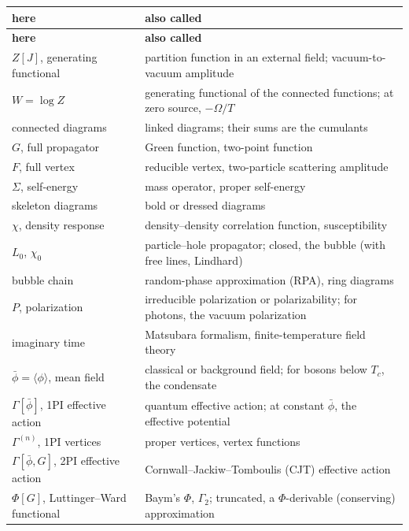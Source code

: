 \documentclass[11pt,a4paper]{article}
\begin{document}
\smallskip
{\footnotesize\renewcommand{\arraystretch}{1.16}\setlength{\LTpre}{0pt}\setlength{\LTpost}{0pt}%
\begin{xltabular}{\linewidth}{@{}>{\raggedright\arraybackslash}p{4.9cm}@{\hspace{0.8em}}>{\raggedright\arraybackslash}X@{}}
\toprule
\textsf{\textbf{here}} & \textsf{\textbf{also called}}\\
\midrule
\endfirsthead
\toprule
\textsf{\textbf{here}} & \textsf{\textbf{also called}}\\
\midrule
\endhead
\bottomrule
\endlastfoot
$Z[J]$, generating functional & partition function in an external field; vacuum-to-vacuum amplitude\\
$W=\log Z$ & generating functional of the connected functions; at zero source, $-\Omega/T$\\
connected diagrams & linked diagrams; their sums are the cumulants\\
$G$, full propagator & Green function, two-point function\\
$F$, full vertex & reducible vertex, two-particle scattering amplitude\\
$\Sigma$, self-energy & mass operator, proper self-energy\\
skeleton diagrams & bold or dressed diagrams\\
$\chi$, density response & density--density correlation function, susceptibility\\
$L_0$, $\chi_0$ & particle--hole propagator; closed, the bubble (with free lines, Lindhard)\\
bubble chain & random-phase approximation (RPA), ring diagrams\\
$P$, polarization & irreducible polarization or polarizability; for photons, the vacuum polarization\\
imaginary time & Matsubara formalism, finite-temperature field theory\\
$\bar\phi=\langle\phi\rangle$, mean field & classical or background field; for bosons below $T_c$, the condensate\\
$\Gamma[\bar\phi]$, 1PI effective action & quantum effective action; at constant $\bar\phi$, the effective potential\\
$\Gamma^{(n)}$, 1PI vertices & proper vertices, vertex functions\\
$\Gamma[\bar\phi,G]$, 2PI effective action & Cornwall--Jackiw--Tomboulis (CJT) effective action\\
$\Phi[G]$, Luttinger--Ward functional & Baym's $\Phi$, $\Gamma_2$; truncated, a $\Phi$-derivable (conserving) approximation\\

\end{xltabular}}
\end{document}
